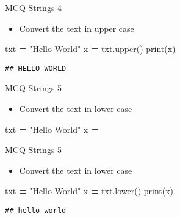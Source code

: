 \documentclass[
  8pt,
  ignorenonframetext,
]{beamer}
\newenvironment{Shaded}{\begin{snugshade}}{\end{snugshade}}
\newcommand{\BuiltInTok}[1]{#1}
\newcommand{\NormalTok}[1]{#1}
\newcommand{\OperatorTok}[1]{\textcolor[rgb]{0.81,0.36,0.00}{\textbf{#1}}}
\newcommand{\StringTok}[1]{\textcolor[rgb]{0.31,0.60,0.02}{#1}}
\providecommand{\tightlist}{%
  \setlength{\itemsep}{0pt}\setlength{\parskip}{0pt}}
\begin{document}
\begin{frame}[fragile]{MCQ Strings 4}
\protect\hypertarget{mcq-strings-4-1}{}
\begin{itemize}
\tightlist
\item
  Convert the text in upper case
\end{itemize}

\begin{Shaded}
\begin{Highlighting}[]
\NormalTok{txt }\OperatorTok{=} \StringTok{"Hello World"}
\NormalTok{x }\OperatorTok{=}\NormalTok{ txt.upper()}
\BuiltInTok{print}\NormalTok{(x)}
\end{Highlighting}
\end{Shaded}

\begin{verbatim}
## HELLO WORLD
\end{verbatim}
\end{frame}

\begin{frame}[fragile]{MCQ Strings 5}
\protect\hypertarget{mcq-strings-5}{}
\begin{itemize}
\tightlist
\item
  Convert the text in lower case
\end{itemize}

\begin{Shaded}
\begin{Highlighting}[]
\NormalTok{txt }\OperatorTok{=} \StringTok{"Hello World"}
\NormalTok{x }\OperatorTok{=} 
\end{Highlighting}
\end{Shaded}
\end{frame}

\begin{frame}[fragile]{MCQ Strings 5}
\protect\hypertarget{mcq-strings-5-1}{}
\begin{itemize}
\tightlist
\item
  Convert the text in lower case
\end{itemize}

\begin{Shaded}
\begin{Highlighting}[]
\NormalTok{txt }\OperatorTok{=} \StringTok{"Hello World"}
\NormalTok{x }\OperatorTok{=}\NormalTok{ txt.lower()}
\BuiltInTok{print}\NormalTok{(x)}
\end{Highlighting}
\end{Shaded}

\begin{verbatim}
## hello world
\end{verbatim}
\end{frame}
\end{document}
